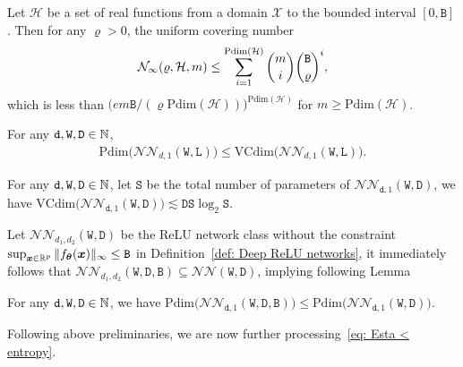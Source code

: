    \begin{lemma}\label{lemma: covering number < Pdim}
        Let $\mathcal{H}$ be a set of real functions from a domain $\mathcal{X}$ to the bounded interval $[0,\mathtt{B}]$. Then for any $\varrho > 0$, the uniform covering number
        \begin{align*}
            \mathcal{N}_\infty(\varrho, \mathcal{H}, m) \leq \sum_{i=1}^{\mathrm{Pdim}(\mathcal{H})}\dbinom{m}{i}\dbinom{\mathtt{B}}{\varrho}^i,
        \end{align*}
        which is less than $\big(em\mathtt{B}/(\varrho\mathrm{Pdim}(\mathcal{H}))\big)^{\mathrm{Pdim}(\mathcal{H})}$ for $m \geq \mathrm{Pdim}(\mathcal{H})$. 
    \end{lemma}

    \begin{lemma}\label{lemma: Pdim < VCdim}
        For any $\mathtt{d}, \mathtt{W}, \mathtt{D} \in \mathbb{N}$,
        \begin{align*}
            \mathrm{Pdim}\big(\mathcal{NN}_{d,1}(\mathtt{W},\mathtt{L})\big) \leq \mathrm{VCdim}\big(\mathcal{NN}_{d,1}(\mathtt{W},\mathtt{L})\big).
        \end{align*}
    \end{lemma}
    \begin{lemma}\label{lemma: VCdim < DSlogS}
    For any $\mathtt{d}, \mathtt{W}, \mathtt{D} \in \mathbb{N}$, let $\mathtt{S}$ be the total number of parameters of $\mathcal{NN}_{\mathtt{d},1}(\mathtt{W}, \mathtt{D})$, we have
        $\mathrm{VCdim}\big(\mathcal{NN}_{\mathtt{d},1}(\mathtt{W}, \mathtt{D})\big) \lesssim \mathtt{D}\mathtt{S}\log_2\mathtt{S}$.
    \end{lemma}

    Let $\mathcal{NN}_{d_1,d_2}(\mathtt{W}, \mathtt{D})$ be the ReLU network class without the constraint $\sup_{\bm{x} \in \mathbb{R}^p} \Vert f_{\bm{\theta}}(\bm{x}) \Vert_{\infty} \le \mathtt{B}$ in Definition~\ref{def: Deep ReLU networks}, it immediately follows that $\mathcal{NN}_{d_1,d_2}(\mathtt{W}, \mathtt{D}, \mathtt{B}) \subseteq \mathcal{NN}(\mathtt{W}, \mathtt{D})$, implying following Lemma
    \begin{lemma}\label{lemma: Pdim(NN(W,D,B)) < Pdim(NN(W,D))}
        For any $\mathtt{d}, \mathtt{W}, \mathtt{D} \in \mathbb{N}$, we have  $\mathrm{Pdim}\big(\mathcal{NN}_{\mathtt{d},1}(\mathtt{W}, \mathtt{D}, \mathtt{B})\big) \leq \mathrm{Pdim}\big(\mathcal{NN}_{\mathtt{d},1}(\mathtt{W}, \mathtt{D})\big)$.
    \end{lemma}
    Following above preliminaries, we are now further processing~\eqref{eq: Esta < entropy}. 

